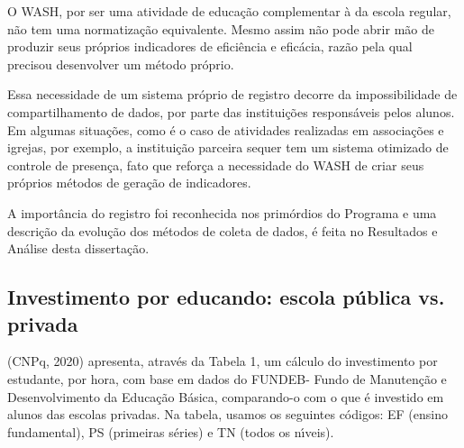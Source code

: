 \documentclass[
12pt,		%
openright,	%
twoside,  %
a4paper,			%
chapter=TITLE,		%
english,			%
french,				%
spanish,			%
brazil				%
]{USPSC-classe/USPSC}
\begin{document}
O WASH, por ser uma atividade de educa\c{c}\~ao complementar \`a da escola regular, n\~ao tem uma normatiza\c{c}\~ao equivalente. Mesmo assim n\~ao pode abrir m\~ao de produzir seus pr\'oprios indicadores de efici\^encia e efic\'acia, raz\~ao pela qual precisou desenvolver um m\'etodo pr\'oprio.

















Essa necessidade de um sistema pr\'oprio de registro decorre da impossibilidade de compartilhamento de dados, por parte das institui\c{c}\~oes respons\'aveis pelos alunos. Em algumas situa\c{c}\~oes, como \'e o caso de atividades realizadas em associa\c{c}\~oes e igrejas, por exemplo, a institui\c{c}\~ao parceira sequer tem um sistema otimizado de controle de presen\c{c}a, fato que refor\c{c}a a necessidade do WASH de criar seus pr\'oprios m\'etodos de gera\c{c}\~ao de indicadores.

















A import\^ancia do registro foi reconhecida nos prim\'ordios do Programa e uma descri\c{c}\~ao da evolu\c{c}\~ao dos m\'etodos de coleta de dados, \'e feita no Resultados e An\'alise desta disserta\c{c}\~ao.

















\subsection[Investimento por educando: escola p\'ublica vs. privada]{Investimento por educando: escola p\'ublica vs. privada}\label{Investimento por educando: escola p\'ublica vs. privada}
(CNPq, 2020)  apresenta, atrav\'es da Tabela 1, um c\'alculo do investimento por estudante, por hora, com base em dados do FUNDEB- Fundo de Manuten\c{c}\~ao e Desenvolvimento da Educa\c{c}\~ao B\'asica, comparando-o com o que \'e investido em alunos das escolas privadas. Na tabela, usamos os seguintes c\'odigos: EF (ensino fundamental), PS (primeiras s\'eries) e TN (todos os n\'{\i}veis).
\end{document}
